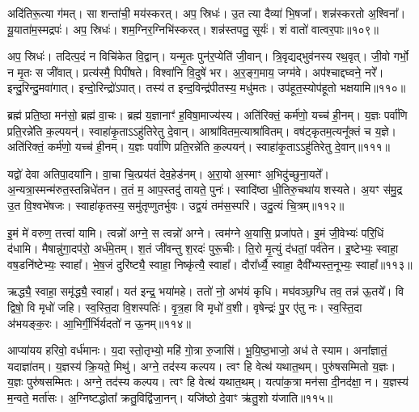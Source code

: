 अदि॑तिरू॒त्या ग॑मत्।
सा शन्ता॑ची॒ मय॑स्करत्।
अप॒ स्रिधः॑।
उ॒त त्या दैव्या॑ भि॒षजा᳚।
शन्न॑स्करतो अ॒श्विना᳚।
यू॒याता॑म॒स्मद्रपः॑।
अप॒ स्रिधः॑।
शम॒ग्निर॒ग्निभि॑स्करत्।
शन्न॑स्तपतु॒ सूर्यः॑।
शं वातो॑ वात्वर॒पाः॥१०९॥\ip

अप॒ स्रिधः॑।
तदित्प॒दं न विचि॑केत वि॒द्वान्।
यन्मृ॒तः पुन॑र॒प्येति॑ जी॒वान्।
त्रि॒वृद्यद्भुव॑नस्य रथ॒वृत्।
जी॒वो गर्भो॒ न मृ॒तः स जी॑वात्।
प्रत्य॑स्मै॒ पिपी॑षते।
विश्वा॑नि वि॒दुषे॑ भर।
अ॒र॒ङ्ग॒माय॒ जग्म॑वे।
अप॑श्चाद्दघ्वने॒ नरे᳚।
इन्दु॒रिन्दु॒मवा॑गात्।
इन्दो॒रिन्द्रो॑\-ऽपात्।
तस्य॑ त इन्द॒विन्द्र॑पीतस्य॒ मधु॑मतः।
उप॑हूत॒स्योप॑हूतो भक्षयामि॥११०॥\ip\anuvakamend[उ॒द॒र्॒ष इ॑न्द्रि॒येण॒ गा म॒तिर॑र॒पा अ॑गा॒त्रीणि॑ च]

ब्रह्म॑ प्रति॒ष्ठा मन॑सो॒ ब्रह्म॑ वा॒चः।
ब्रह्म॑ य॒ज्ञानाꣳ॑ ह॒विषा॒माज्य॑स्य।
अति॑रिक्तं॒ कर्म॑णो॒ यच्च॑ ही॒नम्।
य॒ज्ञः पर्वा॑णि प्रति॒रन्ने॑ति क॒ल्पयन्॑।
स्वाहा॑कृ॒ता\-ऽऽहु॑तिरेतु दे॒वान्।
आश्रा॑वितम॒त्याश्रा॑वितम्।
वष॑ट्कृतम॒त्यनू᳚क्तं च य॒ज्ञे।
अति॑रिक्तं॒ कर्म॑णो॒ यच्च॑ ही॒नम्।
य॒ज्ञः पर्वा॑णि प्रति॒रन्ने॑ति क॒ल्पयन्॑।
स्वाहा॑कृ॒ता\-ऽऽहु॑तिरेतु दे॒वान्॥१११॥\ip

यद्वो॑ देवा अतिपा॒दया॑नि।
वा॒चा चि॒त्प्रय॑तं देव॒हेड॑नम्।
अ॒रा॒यो अ॒स्माꣳ अ॒भिदु॑च्छुना॒यते᳚।
अ॒न्यत्रा॒स्मन्म॑रुत॒स्तन्निधे॑\-तन।
त॒तं म॒ आप॒स्तदु॑ तायते॒ पुनः॑।
स्वादि॑ष्ठा धी॒तिरु॒चथा॑य शस्यते।
अ॒यꣳ स॑मु॒द्र उ॒त वि॒श्वभे॑षजः।
स्वाहा॑कृतस्य॒ समु॑तृप्णुतर्भुवः।
उद्व॒यं तम॑स॒स्परि॑।
उदु॒त्यं चि॒त्रम्॥११२॥\ip

इ॒मं मे॑ वरुण॒ तत्त्वा॑ यामि।
त्वन्नो॑ अग्ने॒ स त्वन्नो॑ अग्ने।
त्वम॑ग्ने अ॒यासि॒ प्रजा॑पते।
इ॒मं जी॒वेभ्यः॑ परि॒धिं द॑धामि।
मैषान्नु॑गा॒दप॑रो॒ अर्ध॑मे॒तम्।
श॒तं जी॑वन्तु श॒रदः॑ पुरू॒चीः।
ति॒रो मृ॒त्युं द॑धतां॒ पर्व॑तेन।
इ॒ष्टेभ्यः॒ स्वाहा॒ वष॒डनि॑ष्टेभ्यः॒ स्वाहा᳚।
भे॒ष॒जं दुरि॑ष्ट्यै॒ स्वाहा॒ निष्कृ॑त्यै॒ स्वाहा᳚।
दौरा᳚र्ध्यै॒ स्वाहा॒ दैवी᳚भ्यस्त॒नूभ्यः॒ स्वाहा᳚॥११३॥\ip

ऋद्ध्यै॒ स्वाहा॒ समृ॑द्ध्यै॒ स्वाहा᳚।
यत॑ इन्द्र॒ भया॑महे।
ततो॑ नो॒ अभ॑यं कृधि।
मघ॑वञ्छ॒ग्धि तव॒ तन्न॑ ऊ॒तये᳚।
वि द्विषो॒ वि मृधो॑ जहि।
स्व॒स्ति॒दा वि॒शस्पतिः॑।
वृ॒त्र॒हा वि मृधो॑ व॒शी।
वृषेन्द्रः॑ पु॒र ए॑तु नः।
स्व॒स्ति॒दा अ॑भयङ्क॒रः।
आ॒भिर्गी॒र्भिर्यदतो॑ न ऊ॒नम्॥११४॥\ip

आप्या॑यय हरिवो॒ वर्ध॑मानः।
य॒दा स्तो॒तृभ्यो॒ महि॑ गो॒त्रा रु॒जासि॑।
भू॒यि॒ष्ठ॒भाजो॒ अध॑ ते स्याम।
अना᳚ज्ञातं॒ यदाज्ञा॑तम्।
य॒ज्ञस्य॑ क्रि॒यते॒ मिथु॑।
अग्ने॒ तद॑स्य कल्पय।
त्वꣳ हि वेत्थ॑ यथात॒थम्।
पुरु॑षसम्मितो य॒ज्ञः।
य॒ज्ञः पुरु॑षसम्मितः।
अग्ने॒ तद॑स्य कल्पय।
त्वꣳ हि वेत्थ॑ यथात॒थम्।
यत्पा॑क॒त्रा मन॑सा दी॒नद॑क्षा॒ न।
य॒ज्ञस्य॑ म॒न्वते॒ मर्ता॑सः।
अ॒ग्निष्टद्धोता᳚ क्रतु॒विद्वि॑जा॒नन्।
यजि॑ष्ठो दे॒वाꣳ ऋ॑तु॒शो य॑जाति॥११५॥\ip\anuvakamend[दे॒वाꣴश्चि॒त्रं त॒नूभ्यः॒ स्वाहो॒नं पुरु॑षसम्मि॒तो\-ऽग्ने॒ तद॑स्य कल्पय॒ पञ्च॑ च]

